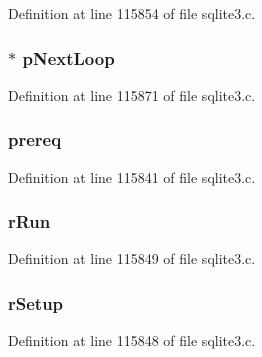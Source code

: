 Definition at line 115854 of file sqlite3.\+c.

\hypertarget{struct_where_loop_a5dbc670d4951c6bbab7470ab07fd2d3c}{}
\subsubsection[{p\+Next\+Loop}]{$\ast$ p\+Next\+Loop}\label{struct_where_loop_a5dbc670d4951c6bbab7470ab07fd2d3c}


Definition at line 115871 of file sqlite3.\+c.

\hypertarget{struct_where_loop_aae7565677c852f3ea5f63a3d5fae63a7}{}
\subsubsection[{prereq}]{ prereq}\label{struct_where_loop_aae7565677c852f3ea5f63a3d5fae63a7}


Definition at line 115841 of file sqlite3.\+c.

\hypertarget{struct_where_loop_a19a591aa81312e9d7f3e26df94f10abe}{}
\subsubsection[{r\+Run}]{ r\+Run}\label{struct_where_loop_a19a591aa81312e9d7f3e26df94f10abe}


Definition at line 115849 of file sqlite3.\+c.

\hypertarget{struct_where_loop_a9141f9ef602baa41618d3dd9f85af0f3}{}
\subsubsection[{r\+Setup}]{ r\+Setup}\label{struct_where_loop_a9141f9ef602baa41618d3dd9f85af0f3}


Definition at line 115848 of file sqlite3.\+c.

\hypertarget{struct_where_loop_a4b7109c9afc6317a714fc4748de1b95a}{}
